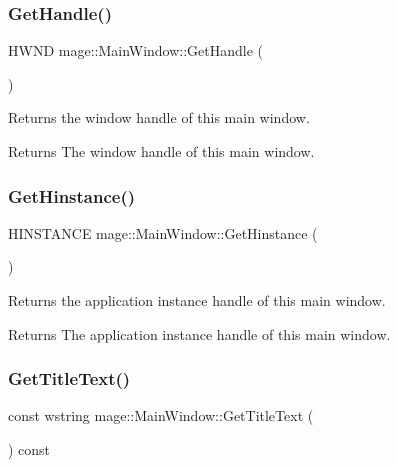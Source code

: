 \subsubsection{\texorpdfstring{Get\+Handle()}{GetHandle()}}
{\footnotesize\ttfamily H\+W\+ND mage\+::\+Main\+Window\+::\+Get\+Handle (\begin{DoxyParamCaption}{ }\end{DoxyParamCaption})\hspace{0.3cm}{\ttfamily [noexcept]}}

Returns the window handle of this main window.

\begin{DoxyReturn}{Returns}
The window handle of this main window. 
\end{DoxyReturn}
\hypertarget{classmage_1_1_main_window_a1b8c851147ea3b51e645c2fce961fe17}{}\label{classmage_1_1_main_window_a1b8c851147ea3b51e645c2fce961fe17} 
\subsubsection{\texorpdfstring{Get\+Hinstance()}{GetHinstance()}}
{\footnotesize\ttfamily H\+I\+N\+S\+T\+A\+N\+CE mage\+::\+Main\+Window\+::\+Get\+Hinstance (\begin{DoxyParamCaption}{ }\end{DoxyParamCaption})\hspace{0.3cm}{\ttfamily [noexcept]}}

Returns the application instance handle of this main window.

\begin{DoxyReturn}{Returns}
The application instance handle of this main window. 
\end{DoxyReturn}
\hypertarget{classmage_1_1_main_window_a16ea3780659e00c8e4732b518c7c4a1e}{}\label{classmage_1_1_main_window_a16ea3780659e00c8e4732b518c7c4a1e} 
\subsubsection{\texorpdfstring{Get\+Title\+Text()}{GetTitleText()}}
{\footnotesize\ttfamily const wstring mage\+::\+Main\+Window\+::\+Get\+Title\+Text (\begin{DoxyParamCaption}{ }\end{DoxyParamCaption}) const\hspace{0.3cm}{\ttfamily [noexcept]}}

